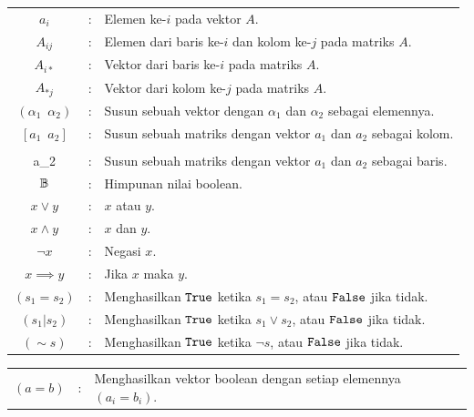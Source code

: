 {\begin{tabular}{@{}c@{\ }l@{\enspace}l}
		\(a_i\) &:& Elemen ke-\(i\) pada vektor \(A\). \\

		\(A_{ij}\) &:& Elemen dari baris ke-\(i\) dan kolom ke-\(j\) pada matriks \(A\). \\

		\(A_{i*}\) &:& Vektor dari baris ke-\(i\) pada matriks \(A\). \\

		\(A_{*j}\) &:& Vektor dari kolom ke-\(j\) pada matriks \(A\). \\

		\((\alpha_1 \enspace \alpha_2)\) &:& Susun sebuah vektor dengan \(\alpha_1\) dan \(\alpha_2\) sebagai elemennya.\\

		\(\left[ a_1 \enspace a_2 \right]\) &:& Susun sebuah matriks dengan vektor \(a_1\) dan \(a_2\) sebagai kolom. \\ [.5em]

		\(\left[ \begin{array}{c} a_1 \\ a_2 \end{array} \right]\) &:& Susun sebuah matriks dengan vektor \(a_1\) dan \(a_2\) sebagai baris. \\ [1em]

		\(\Bbb\) &:& Himpunan nilai boolean. \\

		\(x \vee y\) &:& \(x\) atau \(y\). \\

		\(x \wedge y\) &:& \(x\) dan \(y\). \\

		\(\neg x\) &:& Negasi \(x\). \\

		\(x \implies y\) &:& Jika \(x\) maka \(y\). \\

		\((s_1 = s_2)\) &:& Menghasilkan \(\True\) ketika \(s_1 = s_2\), atau \(\False\) jika tidak. \\

		\((s_1 | s_2)\) &:& Menghasilkan \(\True\) ketika \(s_1 \vee s_2\), atau \(\False\) jika tidak. \\

		\((\sim\!s)\) &:& Menghasilkan \(\True\) ketika \(\neg s\), atau \(\False\) jika tidak. \\
	\end{tabular}

	\noindent \begin{tabular}{@{}c@{\ }l@{\enspace}l}
		\((a = b)\) &:& Menghasilkan vektor boolean dengan setiap elemennya \((a_i = b_i)\). \\


\end{tabular}}

